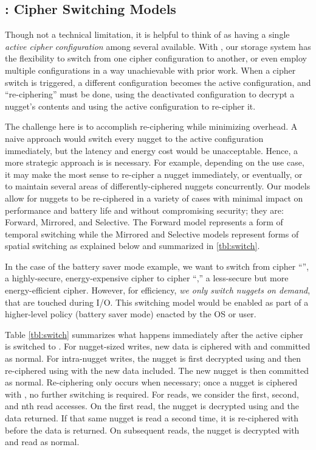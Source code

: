 \subsection{\sysA: Cipher Switching Models}\label{subsec:des-switch}

Though not a technical limitation, it is helpful to think of \sys as having a
single {\em active cipher configuration} among several available. With \sysA,
our storage system has the flexibility to switch from one cipher configuration
to another, or even employ multiple configurations in a way unachievable with
prior work. When a cipher switch is triggered, a different configuration becomes
the active configuration, and ``re-ciphering'' must be done, \ie using the
deactivated configuration to decrypt a nugget's contents and using the active
configuration to re-cipher it.

The challenge here is to accomplish re-ciphering while minimizing overhead. A
naive approach would switch every nugget to the active configuration
immediately, but the latency and energy cost would be unacceptable. Hence, a
more strategic approach is is necessary. For example, depending on the use case,
it may make the most sense to re-cipher a nugget immediately, or eventually, or
to maintain several areas of differently-ciphered nuggets concurrently. Our
models allow for nuggets to be re-ciphered in a variety of cases with minimal
impact on performance and battery life and without compromising security; they
are: Forward, Mirrored, and Selective. The Forward model represents a form of
temporal switching while the Mirrored and Selective models represent forms of
spatial switching as explained below and summarized in \cref{tbl:switch}.




 In the case of the battery saver mode example, we
want to switch from cipher ``\cone'', a highly-secure, energy-expensive cipher
to cipher ``\ctwo,'' a less-secure but more energy-efficient cipher. However,
for efficiency, {\em we only switch nuggets on demand}, \ie that are touched
during I/O. This switching model would be enabled as part of a higher-level
policy (\ie battery saver mode) enacted by the OS or user.

Table \cref{tbl:switch} summarizes what happens immediately after the active
cipher is switched to \ctwo. For nugget-sized writes, new data is ciphered with
\ctwo and committed as normal. For intra-nugget writes, the nugget is first
decrypted using \cone and then re-ciphered using \ctwo with the new data
included. The new nugget is then committed as normal. Re-ciphering only occurs
when necessary; once a nugget is ciphered with \ctwo, no further switching is
required. For reads, we consider the first, second, and nth read accesses. On
the first read, the nugget is decrypted using \cone and the data returned. If
that same nugget is read a second time, it is re-ciphered with \ctwo before the
data is returned. On subsequent reads, the nugget is decrypted with \ctwo and
read as normal.

